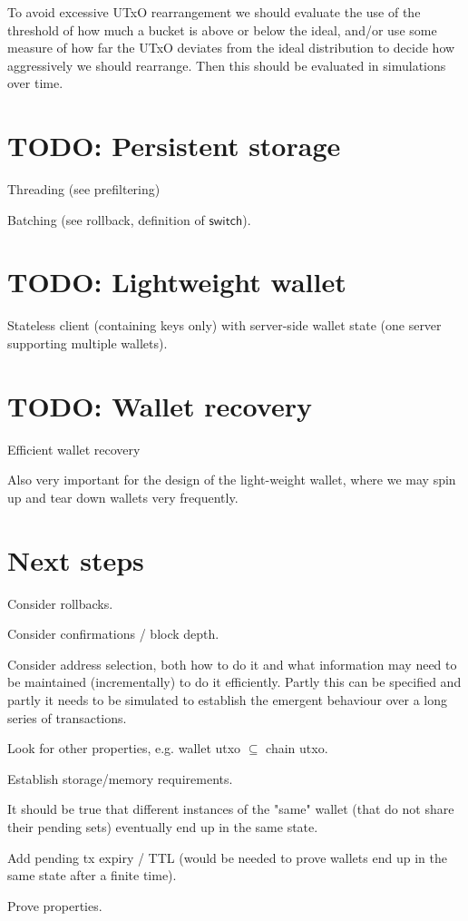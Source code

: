 \documentclass{article}
\begin{document}
To avoid excessive UTxO rearrangement we should evaluate the use of the
threshold of how much a bucket is above or below the ideal, and/or use some
measure of how far the UTxO deviates from the ideal distribution to decide
how aggressively we should rearrange. Then this should be evaluated in
simulations over time.

\section{TODO: Persistent storage}

Threading (see prefiltering)

Batching (see rollback, definition of $\mathsf{switch}$).

\section{TODO: Lightweight wallet}

Stateless client (containing keys only) with server-side wallet state
(one server supporting multiple wallets).

\section{TODO: Wallet recovery}

Efficient wallet recovery

Also very important for the design of the light-weight wallet, where we may
spin up and tear down wallets very frequently.

\section{Next steps}

Consider rollbacks.

Consider confirmations / block depth.

Consider address selection, both how to do it and what information may need to
be maintained (incrementally) to do it efficiently. Partly this can be specified
and partly it needs to be simulated to establish the emergent behaviour over a
long series of transactions.

Look for other properties, e.g. wallet utxo $\subseteq$ chain utxo.

Establish storage/memory requirements.

It should be true that different instances of the "same" wallet (that do not share their pending sets) eventually end up in the same state.

Add pending tx expiry / TTL (would be needed to prove wallets end up in the same state after a finite time).

Prove properties.



\end{document}
